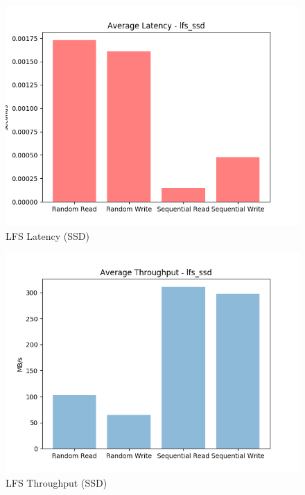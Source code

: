 \documentclass[10pt, author, twocolumn]{article}
\begin{document}
\begin{figure}[t!]
    \includegraphics[scale=0.5]{../graphs/lfs_ssd-lat.png}
    \caption{LFS Latency (SSD)}
    \label{fig:ssd_lfs_lat}
\end{figure}

\begin{figure}[t!]
    \includegraphics[scale=0.5]{../graphs/lfs_ssd-thru.png}
    \caption{LFS Throughput (SSD)}
    \label{fig:ssd_lfs_thru}
\end{figure}



\end{document}
